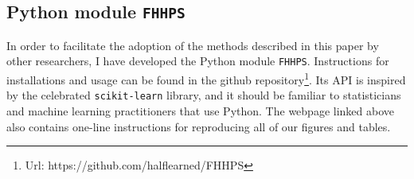 \begin{table}[H]
  \singlespacing
  \caption{Performance measures for estimates of Std[B_1]}
  
\end{table}

\begin{table}[H]
  \singlespacing
  \caption{Performance measures for estimates of Cov[A_1, B_1]}
  
\end{table}
 
\begin{table}[H]
  \singlespacing
  \caption{Performance measures for estimates of Corr[A_1, B_1]}
  
\end{table}

 
\subsection{Python module \texttt{FHHPS}}

In order to facilitate the adoption of the methods described in this paper by other researchers, I have developed the Python module \texttt{FHHPS}. Instructions for installations and usage can be found in the github repository\footnote{Url: https://github.com/halflearned/FHHPS}. Its API is inspired by the celebrated \texttt{scikit-learn} library\cite{sklearn_api}, and it should be familiar to statisticians and machine learning practitioners that use Python. The webpage linked above also contains one-line instructions for reproducing all of our figures and tables. 

\clearpage
\begin{landscape}
\begin{table}[H]
  \singlespacing
  \caption{Panel regressions}
  
  \label{tab:panel_lm_table}
\end{table}
\end{landscape}


 



